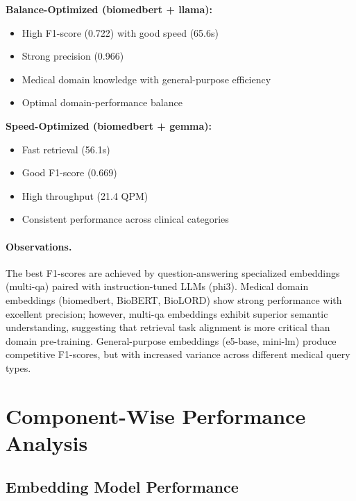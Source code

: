 \textbf{Balance-Optimized (biomedbert + llama):}
\begin{itemize}
    \item High F1-score (0.722) with good speed (65.6s)
    \item Strong precision (0.966)
    \item Medical domain knowledge with general-purpose efficiency
    \item Optimal domain-performance balance
\end{itemize}

\textbf{Speed-Optimized (biomedbert + gemma):}
\begin{itemize}
    \item Fast retrieval (56.1s)
    \item Good F1-score (0.669)
    \item High throughput (21.4 QPM)
    \item Consistent performance across clinical categories
\end{itemize}

\paragraph{Observations.} The best F1-scores are achieved by question-answering specialized embeddings (multi-qa) paired with instruction-tuned LLMs (phi3). Medical domain embeddings (biomedbert, BioBERT, BioLORD) show strong performance with excellent precision; however, multi-qa embeddings exhibit superior semantic understanding, suggesting that retrieval task alignment is more critical than domain pre-training. General-purpose embeddings (e5-base, mini-lm) produce competitive F1-scores, but with increased variance across different medical query types.

\section{Component-Wise Performance Analysis}

\subsection{Embedding Model Performance}


